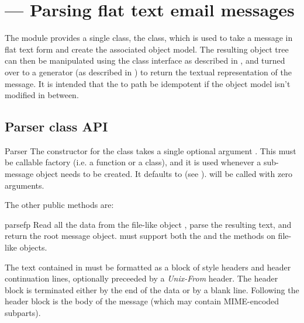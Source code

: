 \section{ ---
         Parsing flat text email messages}



The  module provides a single class, the 
class, which is used to take a message in flat text form and create
the associated object model.  The resulting object tree can then be
manipulated using the  class interface as described in
, and turned over
to a generator (as described in ) to
return the textual representation of the message.  It is intended that
the  to  path be idempotent if the
object model isn't modified in between.

\subsection{Parser class API}

\begin{classdesc}{Parser}{}
The constructor for the  class takes a single optional
argument .  This must be callable factory (i.e. a function
or a class), and it is used whenever a sub-message object needs to be
created.  It defaults to  (see
).   will be called with zero
arguments.
\end{classdesc}

The other public  methods are:

\begin{methoddesc}[Parser]{parse}{fp}
Read all the data from the file-like object , parse the
resulting text, and return the root message object.   must
support both the  and the  methods
on file-like objects.

The text contained in  must be formatted as a block of 
style headers and header continuation lines, optionally preceeded by a
\emph{Unix-From} header.  The header block is terminated either by the
end of the data or by a blank line.  Following the header block is the
body of the message (which may contain MIME-encoded subparts).
\end{methoddesc}

